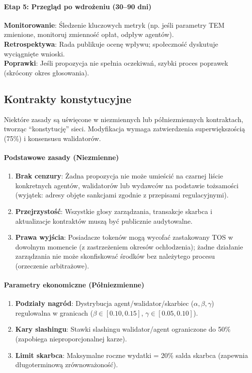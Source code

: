 \documentclass[11pt]{article}
\begin{document}
\paragraph{Etap 5: Przegląd po wdrożeniu (30--90 dni)}
\textbf{Monitorowanie}: Śledzenie kluczowych metryk (np. jeśli parametry TEM zmienione, monitoruj zmienność opłat, odpływ agentów).\\
\textbf{Retrospektywa}: Rada publikuje ocenę wpływu; społeczność dyskutuje wyciągnięte wnioski.\\
\textbf{Poprawki}: Jeśli propozycja nie spełnia oczekiwań, szybki proces poprawek (skrócony okres głosowania).

\subsection{Kontrakty konstytucyjne}

Niektóre zasady są uświęcone w niezmiennych lub półniezmiennych kontraktach, tworząc ``konstytucję'' sieci. Modyfikacja wymaga zatwierdzenia superwiększością (75\%) i konsensusu walidatorów.

\paragraph{Podstawowe zasady (Niezmienne)}
\begin{enumerate}[noitemsep]
  \item \textbf{Brak cenzury}: Żadna propozycja nie może umieścić na czarnej liście konkretnych agentów, walidatorów lub wydawców na podstawie tożsamości (wyjątek: adresy objęte sankcjami zgodnie z przepisami regulacyjnymi).
  \item \textbf{Przejrzystość}: Wszystkie głosy zarządzania, transakcje skarbca i aktualizacje kontraktów muszą być publicznie audytowalne.
  \item \textbf{Prawa wyjścia}: Posiadacze tokenów mogą wycofać zastakowany TOS w dowolnym momencie (z zastrzeżeniem okresów ochłodzenia); żadne działanie zarządzania nie może skonfiskować środków bez należytego procesu (orzeczenie arbitrażowe).
\end{enumerate}

\paragraph{Parametry ekonomiczne (Półniezmienne)}
\begin{enumerate}[noitemsep]
  \item \textbf{Podziały nagród}: Dystrybucja agent/walidator/skarbiec ($\alpha, \beta, \gamma$) regulowalna w granicach ($\beta \in [0.10, 0.15]$, $\gamma \in [0.05, 0.10]$).
  \item \textbf{Kary slashingu}: Stawki slashingu walidator/agent ograniczone do 50\% (zapobiega nieproporcjonalnej karze).
  \item \textbf{Limit skarbca}: Maksymalne roczne wydatki = 20\% salda skarbca (zapewnia długoterminową zrównoważoność).
\end{enumerate}
\end{document}
